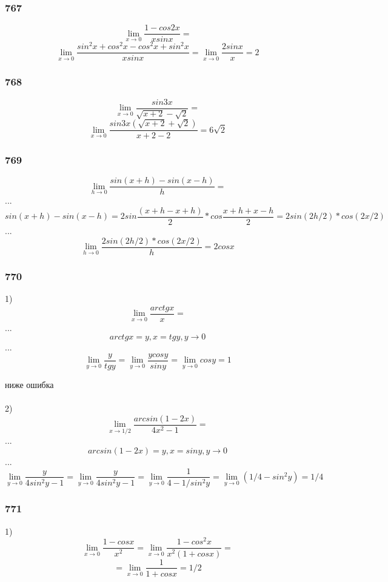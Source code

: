 \documentclass[12pt]{article}
\begin{document}
\newpage
\subsubsection{767}
$$
\lim_{x\to 0} \frac{1-cos2x}{xsinx} = 
$$
$$
\lim_{x\to 0} \frac{sin^2x+cos^2x-cos^2x+sin^2x}{xsinx} =  \lim_{x\to 0} \frac{2sinx}{x} = 2
$$

\newpage
\subsubsection{768}
$$
\lim_{x\to 0} \frac{sin3x}{\sqrt{x+2}-\sqrt{2}} = 
$$
$$
\lim_{x\to 0} \frac{sin3x(\sqrt{x+2}+\sqrt{2})}{x+2-2} = 6\sqrt{2}
$$

\newpage
\subsubsection{769}
$$
\lim_{h\to 0} \frac{sin(x+h)-sin(x-h)}{h} = 
$$
...
$$
sin(x+h)-sin(x-h) = 2sin\frac{(x+h-x+h)}{2}*cos\frac{x+h+x-h}{2} = 2sin(2h/2)*cos(2x/2)
$$
...
$$
\lim_{h\to 0} \frac{2sin(2h/2)*cos(2x/2)}{h} = 2cosx
$$

\newpage
\subsubsection{770}
1)
$$
\lim_{x\to 0} \frac{arctgx}{x} = 
$$
...
$$
arctgx = y, x = tgy, y \to  0 
$$
...
$$
\lim_{y\to 0} \frac{y}{tgy} = \lim_{y\to 0} \frac{ycosy}{siny} =\lim_{y\to 0}  cosy = 1 
$$

ниже ошибка\\
 \\
2)
$$
\lim_{x\to 1/2} \frac{arcsin(1-2x)}{4x^2-1} = 
$$
...
$$
arcsin(1-2x) = y, x = siny, y \to  0 
$$
...
$$
\lim_{y\to 0} \frac{y}{4sin^2y-1} = \lim_{y\to 0} \frac{y}{4sin^2y-1} =\lim_{y\to 0} \frac{1}{4-1/sin^2y}=\lim_{y\to 0} (1/4 - sin^2y) = 1/4
$$

\newpage
\subsubsection{771}
1)
$$
\lim_{x\to 0} \frac{1-cosx}{x^2} = 
\lim_{x\to 0} \frac{1-cos^2x}{x^2(1+cosx)}=
$$
$$
=\lim_{x\to 0} \frac{1}{1+cosx}=1/2
$$
\end{document}
